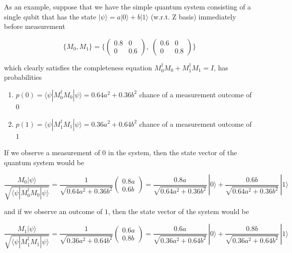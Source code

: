 \documentclass{article}
\begin{document}
      
      \begin{example}
        As an example, suppose that we have the simple quantum system consisting of a single qubit that has the state $|\psi \rangle = a|0\rangle + b|1 \rangle$  (w.r.t. Z basis) immediately before measurement

          \[\{M_0, M_1\} = \bigg\{ \begin{pmatrix} 0.8 & 0 \\  0 & 0.6 \end{pmatrix}, \; \begin{pmatrix} 0.6&0\\0&0.8 \end{pmatrix} \bigg\}\]

        which clearly satisfies the completeness equation $M_0^\dagger M_0 + M_1^\dagger M_1 = I$, has probabilities

        \begin{enumerate}
          \item $p(0) = \langle \psi | M_0^\dagger M_0 | \psi \rangle = 0.64 a^2 + 0.36b^2$ chance of a measurement outcome of $0$
          \item $p(1) = \langle \psi | M_1^\dagger M_1 | \psi \rangle = 0.36 a^2 + 0.64b^2$ chance of a measurement outcome of $1$
        \end{enumerate}

        If we observe a measurement of $0$ in the system, then the state vector of the quantum system would be

          \[\frac{M_0 | \psi\rangle}{\sqrt{\langle \psi | M_0^\dagger M_0 | \psi\rangle}} = \frac{1}{\sqrt{0.64a^2 + 0.36b^2}} \begin{pmatrix} 0.8a \\ 0.6b \end{pmatrix} = \frac{0.8a}{\sqrt{0.64a^2 + 0.36b^2}}\, |0 \rangle + \frac{0.6 b}{\sqrt{0.64a^2 + 0.36b^2}} \, |1\rangle\]

        and if we observe an outcome of $1$, then the state vector of the system would be

          \[\frac{M_1 | \psi\rangle}{\sqrt{\langle \psi | M_1^\dagger M_1 | \psi\rangle}} = \frac{1}{\sqrt{0.36a^2 + 0.64b^2}} \begin{pmatrix} 0.6a \\ 0.8b \end{pmatrix} = \frac{0.6a}{\sqrt{0.36a^2 + 0.64b^2}}\, |0 \rangle + \frac{0.8 b}{\sqrt{0.36a^2 + 0.64b^2}} \, |1\rangle\]
      \end{example}
\end{document}
